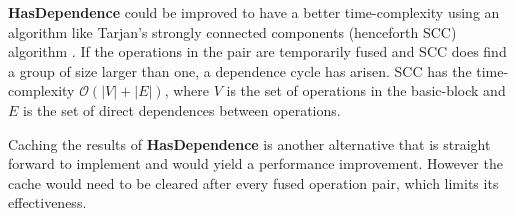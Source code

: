 \documentclass[12pt,a4paper,onecolumn,twoside,openright]{report}
\begin{document}
\textbf{HasDependence} could be improved to have a better time-complexity using an algorithm like Tarjan's strongly connected components (henceforth SCC) algorithm \cite{tarjan1972depth}. If the operations in the pair are temporarily fused and SCC does find a group of size larger than one, a dependence cycle has arisen. SCC has the time-complexity $\mathcal{O}(|V| + |E|)$, where $V$ is the set of operations in the basic-block and $E$ is the set of direct dependences between operations.

Caching the results of \textbf{HasDependence} is another alternative that is straight forward to implement and would yield a performance improvement. However the cache would need to be cleared after every fused operation pair, which limits its effectiveness.





\newpage
{} \label{bibl}

\end{document}
